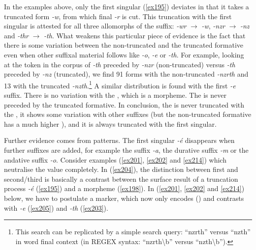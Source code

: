 In the examples above, only the first singular (\ref{ex195}) deviates in that it takes a truncated form \emph{-w}, from which final \emph{-r} is cut. This truncation with the first singular is attested for all three allomorphs of the  suffix: \emph{-wr} $\rightarrow$ \emph{-w}, \emph{-nzr} $\rightarrow$ \emph{-nz} and \emph{-thr} $\rightarrow$ \emph{-th}. What weakens this particular piece of evidence is the fact that there is some variation between the non-truncated and the truncated formative even when other suffixal material follows like \Andat{} \emph{-o}, \Fnsg{} \emph{-e} or \Stnsg{} \emph{-th}. For example, looking at the token  in the corpus of \Stnsg{} \emph{-th} preceded by \emph{-nzr} (non-truncated) versus \emph{-th} preceded by \emph{-nz} (truncated), we find 91  forms with the non-truncated  \emph{-nzrth} and 13 with the truncated  \emph{-nzth}.\footnote{This search can be replicated by a simple search query: ``nzrth'' versus ``nzth'' in word final context (in \textsc{REGEX} syntax: ``nzrth\textbackslash b'' versus ``nzth\textbackslash b'').} A similar distribution is found with the first  \emph{-e} suffix. There is no variation with the \Stsg{}, which is a  morpheme. The \Stsg{} is never preceded by the truncated formative. In conclusion, the  is never truncated with the \Stsg{} , it shows some variation with other suffixes (but the non-truncated formative has a much higher ), and it is always truncated with the first singular.%

Further evidence comes from   patterns. The first singular \emph{-é} disappears when further suffixes are added, for example the  suffix \emph{-a}, the durative suffix \emph{-m} or the andative suffix \emph{-o}. Consider examples (\ref{ex201}, \ref{ex202} and \ref{ex214}) which neutralise the  value completely. In (\ref{ex204}), the distinction between first and second/third  is basically a contrast between the surface result of a truncation process \emph{-é} (\ref{ex195}) and a  morpheme (\ref{ex198}). In (\ref{ex201}, \ref{ex202} and \ref{ex214}) below, we have to postulate a  marker, which now only encodes  (\Sg) and contrasts with \Fnsg{} \emph{-e} (\ref{ex205}) and \Stnsg{} \emph{-th} (\ref{ex203}).


